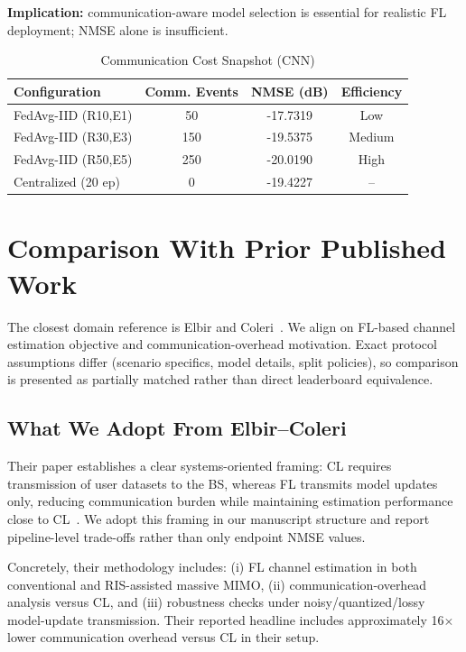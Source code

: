 \documentclass[onecolumn]{IEEEtran}
\begin{document}
\textbf{Implication:} communication-aware model selection is essential for realistic FL deployment; NMSE alone is insufficient.

\begin{table}[t]
\caption{Communication Cost Snapshot (CNN)}
\label{tab:comm}
\centering
\begin{tabular}{lccc}
\toprule
Configuration & Comm. Events & NMSE (dB) & Efficiency \\
\midrule
FedAvg-IID (R10,E1) & 50 & -17.7319 & Low \\
FedAvg-IID (R30,E3) & 150 & -19.5375 & Medium \\
FedAvg-IID (R50,E5) & 250 & -20.0190 & High \\
Centralized (20 ep) & 0 & -19.4227 & -- \\
\bottomrule
\end{tabular}
\end{table}

\section{Comparison With Prior Published Work}
The closest domain reference is Elbir and Coleri~\cite{elbir2021flchannel}. We align on FL-based channel estimation objective and communication-overhead motivation. Exact protocol assumptions differ (scenario specifics, model details, split policies), so comparison is presented as partially matched rather than direct leaderboard equivalence.

\subsection{What We Adopt From Elbir--Coleri}
Their paper establishes a clear systems-oriented framing: CL requires transmission of user datasets to the BS, whereas FL transmits model updates only, reducing communication burden while maintaining estimation performance close to CL~\cite{elbir2021flchannel}. We adopt this framing in our manuscript structure and report pipeline-level trade-offs rather than only endpoint NMSE values.

Concretely, their methodology includes: (i) FL channel estimation in both conventional and RIS-assisted massive MIMO, (ii) communication-overhead analysis versus CL, and (iii) robustness checks under noisy/quantized/lossy model-update transmission. Their reported headline includes approximately 16$\times$ lower communication overhead versus CL in their setup.
\end{document}
